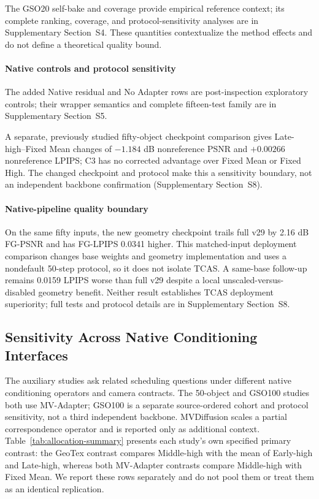\documentclass[times,twocolumn,final]{elsarticle}
\begin{document}
The GSO20 self-bake and coverage provide empirical reference context; its complete ranking, coverage, and protocol-sensitivity analyses are in Supplementary Section~S4. These quantities contextualize the method effects and do not define a theoretical quality bound.

\paragraph{Native controls and protocol sensitivity}
The added Native residual and No Adapter rows are post-inspection exploratory controls; their wrapper semantics and complete fifteen-test family are in Supplementary Section~S5.

A separate, previously studied fifty-object checkpoint comparison gives Late-high--Fixed Mean changes of $-1.184$ dB nonreference PSNR and $+0.00266$ nonreference LPIPS; C3 has no corrected advantage over Fixed Mean or Fixed High. The changed checkpoint and protocol make this a sensitivity boundary, not an independent backbone confirmation (Supplementary Section~S8).

\paragraph{Native-pipeline quality boundary}
On the same fifty inputs, the new geometry checkpoint trails full v29 by 2.16 dB FG-PSNR and has FG-LPIPS 0.0341 higher. This matched-input deployment comparison changes base weights and geometry implementation and uses a nondefault 50-step protocol, so it does not isolate TCAS. A same-base follow-up remains 0.0159 LPIPS worse than full v29 despite a local unscaled-versus-disabled geometry benefit. Neither result establishes TCAS deployment superiority; full tests and protocol details are in Supplementary Section~S8.

\subsection{Sensitivity Across Native Conditioning Interfaces}
\label{subsec:cross-interface}
The auxiliary studies ask related scheduling questions under different native conditioning operators and camera contracts. The 50-object and GSO100 studies both use MV-Adapter; GSO100 is a separate source-ordered cohort and protocol sensitivity, not a third independent backbone. MVDiffusion scales a partial correspondence operator and is reported only as additional context. Table~\ref{tab:allocation-summary} presents each study's own specified primary contrast: the GeoTex contrast compares Middle-high with the mean of Early-high and Late-high, whereas both MV-Adapter contrasts compare Middle-high with Fixed Mean. We report these rows separately and do not pool them or treat them as an identical replication.
\end{document}
